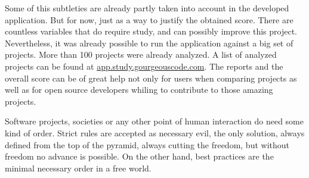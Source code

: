 Some of this subtleties are already partly taken into account in the developed application.
But for now, just as a way to justify the obtained score. 
There are countless variables that do require study, and can possibly improve this project.
Nevertheless, it was already possible to run the application against a big set of projects.
More than 100 projects were already analyzed.
A list of analyzed projects can be found at \url{app.study.gourgeouscode.com}.
The reports and the overall score can be of great help not only for users when comparing projects as well as
for open source developers whiling to contribute to those amazing projects.

Software projects, societies or any other point of human interaction do need some kind of order.
Strict rules are accepted as necessary evil, the only solution, always defined from the top of the pyramid,
always cutting the freedom, but without freedom no advance is possible.
On the other hand, best practices are the minimal necessary order in a free world.
